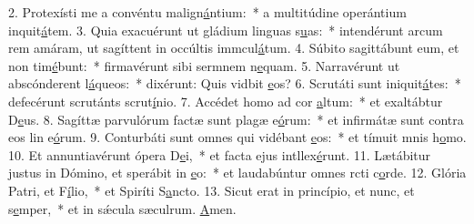 2. Protexísti me a convéntu malign\uline{á}ntium:~* a multitúdine operántium inquit\uline{á}tem.
3. Quia exacuérunt ut gládium linguas s\uline{u}as:~* intendérunt arcum rem amáram, ut sagíttent in occúltis immcul\uline{á}tum.
4. Súbito sagittábunt eum, et non tim\uline{é}bunt:~* firmavérunt sibi sermnem n\uline{e}quam.
5. Narravérunt ut abscónderent l\uline{á}queos:~* dixérunt: Quis vidbit \uline{e}os?
6. Scrutáti sunt iniquit\uline{á}tes:~* defecérunt scrutánts scrut\uline{í}nio.
7. Accédet homo ad cor \uline{a}ltum:~* et exaltábtur D\uline{e}us.
8. Sagíttæ parvulórum factæ sunt plagæ e\uline{ó}rum:~* et infirmátæ sunt contra eos lin e\uline{ó}rum.
9. Conturbáti sunt omnes qui vidébant \uline{e}os:~* et tímuit mnis h\uline{o}mo.
10. Et annuntiavérunt ópera D\uline{e}i,~* et facta ejus intllex\uline{é}runt.
11. Lætábitur justus in Dómino, et sperábit in \uline{e}o:~* et laudabúntur omnes rcti c\uline{o}rde.
12. Glória Patri, et F\uline{í}lio,~* et Spiríti S\uline{a}ncto.
13. Sicut erat in princípio, et nunc, et s\uline{e}mper,~* et in sǽcula sæculrum. \uline{A}men.
